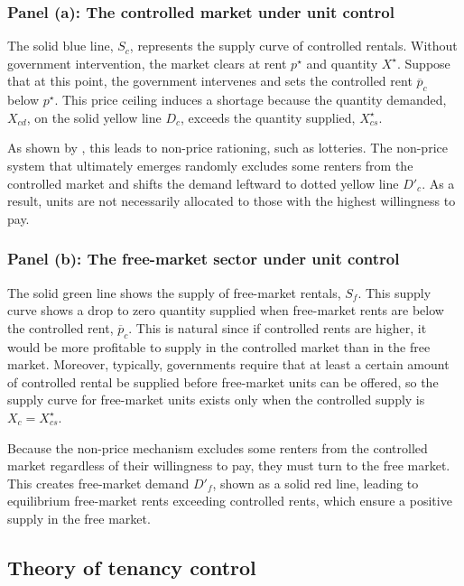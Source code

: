 \documentclass[parskip=full]{article}
\begin{document}
\subsubsection{Panel (a): The controlled market under unit control}
The solid blue line, $S_c$, represents the supply curve of controlled rentals. Without government intervention, the market clears at rent $p^{\star}$ and quantity $X^{\star}$. Suppose that at this point, the government intervenes and sets the controlled rent $\overline{p}_{c}$ below $p^{\star}$. This price ceiling induces a shortage because the quantity demanded, $X_{cd}$, on the solid yellow line $D_c$, exceeds the quantity supplied, $X^{\star}_{cs}$. 

As shown by \citet{gl-2003}, this leads to non-price rationing, such as lotteries. The non-price system that ultimately emerges randomly excludes some renters from the controlled market and shifts the demand leftward to dotted yellow line $D'_c$. As a result, units are not necessarily allocated to those with the highest willingness to pay.

\subsubsection{Panel (b): The free-market sector under unit control}
The solid green line shows the supply of free-market rentals, $S_f$. This supply curve shows a drop to zero quantity supplied when free-market rents are below the controlled rent, $\overline{p}_{c}$. This is natural since if controlled rents are higher, it would be more profitable to supply in the controlled market than in the free market. Moreover, typically, governments require that at least a certain amount of controlled rental be supplied before free-market units can be offered, so the supply curve for free-market units exists only when the controlled supply is $X_c = X^{\star}_{cs}$. 

Because the non-price mechanism excludes some renters from the controlled market regardless of their willingness to pay, they must turn to the free market. This creates free-market demand $D'_f$, shown as a solid red line, leading to equilibrium free-market rents exceeding controlled rents, which ensure a positive supply in the free market.

\subsection{Theory of tenancy control}
\end{document}
